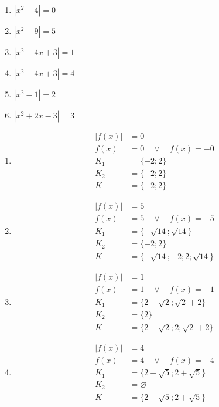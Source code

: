 \documentclass[11pt,a4paper]{article}
\begin{document}
\begin{zadaniReseniBox}[title={Domácí úkol}]
\begin{enumerate}[label=\alph*),itemsep=2pt]
\item $\left|x^{2} - 4\right|=0$
\item $\left|x^{2} - 9\right|=5$
\item $\left|x^{2} - 4x + 3\right|=1$
\item $\left|x^{2} - 4x + 3\right|=4$
\item $\left|x^{2} - 1\right|=2$
\item $\left|x^{2} + 2x - 3\right|=3$
\end{enumerate}
\tcblower
\begin{enumerate}[label=\alph*),itemsep=2pt]
\item
\[\begin{aligned}
|f(x)|&=0\\[2pt]
f(x)&=0\quad\vee\quad f(x)=-0\\[2pt]
K_1&=\{-2;2\}\\[2pt]
K_2&=\{-2;2\}\\[2pt]
K&=\{-2;2\}
\end{aligned}\]
\item
\[\begin{aligned}
|f(x)|&=5\\[2pt]
f(x)&=5\quad\vee\quad f(x)=-5\\[2pt]
K_1&=\{- \sqrt{14};\sqrt{14}\}\\[2pt]
K_2&=\{-2;2\}\\[2pt]
K&=\{- \sqrt{14};-2;2;\sqrt{14}\}
\end{aligned}\]
\item
\[\begin{aligned}
|f(x)|&=1\\[2pt]
f(x)&=1\quad\vee\quad f(x)=-1\\[2pt]
K_1&=\{2 - \sqrt{2};\sqrt{2} + 2\}\\[2pt]
K_2&=\{2\}\\[2pt]
K&=\{2 - \sqrt{2};2;\sqrt{2} + 2\}
\end{aligned}\]
\item
\[\begin{aligned}
|f(x)|&=4\\[2pt]
f(x)&=4\quad\vee\quad f(x)=-4\\[2pt]
K_1&=\{2 - \sqrt{5};2 + \sqrt{5}\}\\[2pt]
K_2&=\varnothing\\[2pt]
K&=\{2 - \sqrt{5};2 + \sqrt{5}\}
\end{aligned}\]

\end{enumerate}
\end{zadaniReseniBox}
\end{document}
